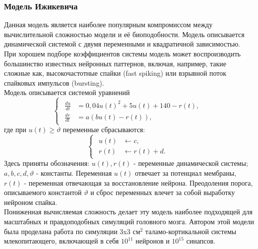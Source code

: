 \documentclass[a4paper,10pt]{article}
\begin{document}
\subsubsection{Модель Ижикевича}
\indent Данная модель является наиболее популярным компромиссом между вычислительной сложностью модели и её биоподобности. Модель описывается динамической системой с двумя переменными и квадратичной зависимостью. При хорошем подборе коэффициентов системы модель может воспроизводить большинство известных нейронных паттернов\cite{IzhSimpleModel}, включая, например, такие сложные как, высокочастотные спайки (fast spiking) или взрывной поток спайковых импульсов (bursting).\\
\indent Модель описывается системой уравнений
\begin{equation}\label{eq:izh}
\left\{  \begin{array}{c} \begin{aligned}
	\frac{du}{dt} &= 0,04u(t)^2+5u(t)+140-r(t), \nonumber \\
	\frac{dr}{dt} &= a(bu(t)-r(t)), \nonumber 
	\end{aligned}	
	\end{array} \right.
\end{equation}
где при $u(t) \geq \vartheta$ переменные сбрасываются:
\begin{equation}\label{eq:izh_reset}
\left\{  \begin{array}{c} \begin{aligned}
	u(t) &\leftarrow c \nonumber, \\
	r(t) &\leftarrow r(t)+d.
	\end{aligned}	
	\end{array} \right.
\end{equation}
Здесь приняты обозначения: $u(t), r(t)$ - переменные динамической системы; $a, b, c, d, \vartheta$ - константы. Переменная $u(t)$ отвечает за потенциал мембраны, $r(t)$ - переменная отвечающая за восстановление нейрона. Преодоления порога, описываемого константой $\vartheta$ и сброс переменных влечет за собой выработку нейроном спайка.\\
\indent Пониженная вычисляемая сложность делает эту модель наиболее подходящей для масштабных и правдоподобных симуляций головного мозга. Автором этой модели была проделана работа \cite{IzhTalam} по симуляции 3x3 см$^2$ таламо-кортикальной системы млекопитающего, включающей в себя $10^{11}$ нейронов и $10^{15}$ синапсов.
\end{document}
